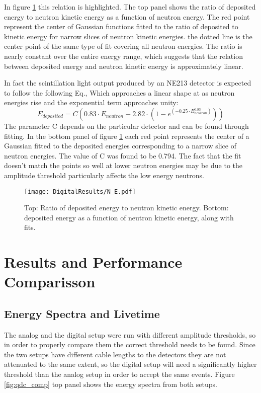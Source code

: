 \documentclass[main.tex]{subfiles}
\begin{document}
In figure \ref{fig:N_E} this relation is highlighted. The top panel shows the ratio of deposited energy to neutron kinetic energy as a function of neutron energy. The red point represent the center of Gaussian functions fitted to the ratio of deposited to kinetic energy for narrow slices of neutron kinetic energies. the dotted line is the center point of the same type of fit covering all neutron energies. The ratio is nearly constant over the entire energy range, which suggests that the relation between deposited energy and neutron kinetic energy is approximately linear.

In fact the scintillation light output produced by an NE213 detector is expected to follow the following Eq.\cite{Scherzinger:2016}, Which approaches a linear shape at as neutron energies rise and the exponential term approaches unity:
\begin{equation}
	E_{deposited} = C\left(  0.83\cdot E_{neutron} - 2.82\cdot\left(  1 - e^{(-0.25\cdot E_{neutron}^{0.93})}  \right)  \right)
\end{equation}
The parameter C depends on the particular detector and can be found through fitting. In the bottom panel of figure \ref{fig:N_E} each red point represents the center of a Gaussian fitted to the deposited energies corresponding to a narrow slice of neutron energies. The value of C was found to be 0.794. The fact that the fit doesn't match the points so well at lower neutron energies may be due to the amplitude threshold particularly affects the low energy neutrons.

\begin{figure}[ht]
    \centering
        \texttt{[image: DigitalResults/N\_E.pdf]}
        \caption[Neutron kinetic energy and deposited energy.]{Top: Ratio of deposited energy to neutron kinetic energy. Bottom: deposited energy as a function of neutron kinetic energy, along with fits.}
    \label{fig:N_E} 
\end{figure}

\section{Results and Performance Comparisson}\label{sec:comp}
\subsection{Energy Spectra and Livetime}
The analog and the digital setup were run with different amplitude thresholds, so in order to properly compare them the correct threshold needs to be found. Since the two setups have different cable lengths to the detectors they are not attenuated to the same extent, so the digital setup will need a significantly higher threshold than the analog setup in order to accept the same events. Figure \ref{fig:qdc_comp} top panel shows the energy spectra from both setups.
\end{document}

